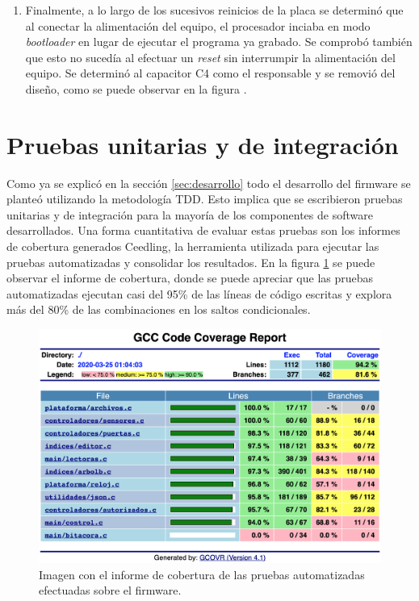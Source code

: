 \begin{enumerate}
	\item Finalmente, a lo largo de los sucesivos reinicios de la placa se determinó que al conectar la alimentación del equipo, el procesador inciaba en modo \emph{bootloader} en lugar de ejecutar el programa ya grabado. Se comprobó también que esto no sucedía al efectuar un \emph{reset} sin interrumpir la alimentación del equipo. Se determinó al capacitor C4 como el responsable y se removió del diseño, como se puede observar en la figura \label{fig:ErroresPrototipo}.
\end{enumerate}

\FloatBarrier

\section{Pruebas unitarias y de integración}
\label{sec:PruebasFirmware}

Como ya se explicó en la sección \ref{sec:desarrollo} todo el desarrollo del firmware se planteó utilizando la metodología TDD. Esto implica que se escribieron pruebas unitarias y de integración para la mayoría de los componentes de software desarrollados. Una forma cuantitativa de evaluar estas pruebas son los informes de cobertura generados Ceedling, la herramienta utilizada para ejecutar las pruebas automatizadas y consolidar los resultados. En la figura \ref{fig:Cobertura} se puede observar el informe de cobertura, donde se puede apreciar que las pruebas automatizadas ejecutan casi del 95\% de las líneas de código escritas y explora más del 80\% de las combinaciones en los saltos condicionales.

\begin{figure}[ht]
	\centering
	\includegraphics[width=\textwidth]{Figures/Cobertura.png}
	\caption[Informe con la cobertura de las pruebas]{Imagen con el informe de cobertura de las pruebas automatizadas efectuadas sobre el firmware.}
	\label{fig:Cobertura}
\end{figure}

